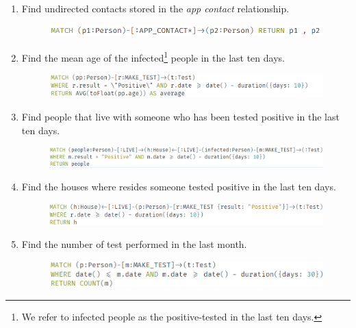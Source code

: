 \begin{enumerate}[leftmargin=*,label=\textbf{\thesection.\arabic*}]
    \item Find undirected contacts stored in the \textit{app contact} relationship.
    \begin{figure}[h]
        \centering
        \includegraphics[width=\textwidth]{images/find_indirected_app_contacts.png}
    \end{figure} 
    \item Find the mean age of the infected\footnote{We refer to infected people as the positive-tested in the last ten days.} people in the last ten days.
    \begin{figure}[h]
        \centering
        \includegraphics[width=\textwidth]{images/mea_age_last_days.png}
    \end{figure} 
    \item Find people that live with someone who has been tested positive in the last ten days.
    \begin{figure}[h]
        \centering
        \includegraphics[width=\textwidth]{images/mates_of_positive.png}
    \end{figure} 
\item Find the houses where resides someone tested positive in the last ten days.
    \begin{figure}[!htb]
        \centering
        \includegraphics[width=\textwidth]{images/homes_with_positive.png}
    \end{figure}
\newpage
    \item Find the number of test performed in the last month.
    \begin{figure}[h]
        \centering
        \includegraphics[width=\textwidth]{images/tests_last_30_days.png}

\end{figure}
\end{enumerate}
